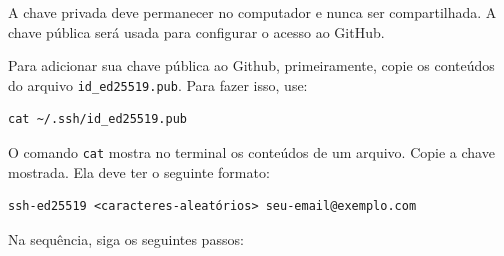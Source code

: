 A chave privada deve permanecer no computador e nunca ser compartilhada. A chave pública será usada para configurar o acesso ao GitHub.

Para adicionar sua chave pública ao Github, primeiramente, copie os conteúdos do arquivo \texttt{id\_ed25519.pub}. Para fazer isso, use:

\begin{lstlisting}[style=shellstyle]
cat ~/.ssh/id_ed25519.pub
\end{lstlisting}

O comando \texttt{cat} mostra no terminal os conteúdos de um arquivo. Copie a chave mostrada. Ela deve ter o seguinte formato:

\begin{lstlisting}[style=shellstyle]
ssh-ed25519 <caracteres-aleatórios> seu-email@exemplo.com
\end{lstlisting}

Na sequência, siga os seguintes passos:

